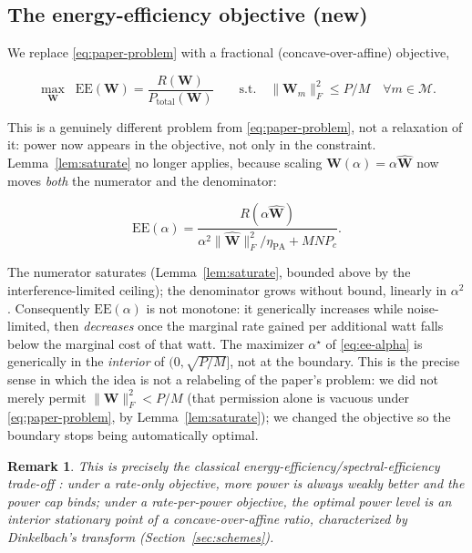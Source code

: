 \documentclass[11pt]{article}
\newtheorem{remark}{Remark}
\begin{document}
\subsection{The energy-efficiency objective (new)}

We replace \eqref{eq:paper-problem} with a fractional (concave-over-affine)
objective,

\begin{equation}
  \max_{\mathbf{W}} \;\; \mathrm{EE}(\mathbf{W}) = \frac{R(\mathbf{W})}{P_{\text{total}}(\mathbf{W})}
  \qquad \text{s.t.} \quad \|\mathbf{W}_m\|_F^2 \le P/M \quad \forall m\in\mathcal{M}.
  \label{eq:ee-problem}
\end{equation}

This is a genuinely different problem from \eqref{eq:paper-problem}, not a
relaxation of it: power now appears in the objective, not only in the
constraint. Lemma~\ref{lem:saturate} no longer applies, because scaling
$\mathbf{W}(\alpha)=\alpha\hat{\mathbf{W}}$ now moves \emph{both} the
numerator and the denominator:

\begin{equation}
  \mathrm{EE}(\alpha) = \frac{R(\alpha\hat{\mathbf{W}})}
  {\alpha^2\|\hat{\mathbf{W}}\|_F^2/\eta_{\text{PA}} + MNP_c}.
  \label{eq:ee-alpha}
\end{equation}

The numerator saturates (Lemma~\ref{lem:saturate}, bounded above by the
interference-limited ceiling); the denominator grows without bound, linearly
in $\alpha^2$. Consequently $\mathrm{EE}(\alpha)$ is not monotone: it
generically increases while noise-limited, then \emph{decreases} once the
marginal rate gained per additional watt falls below the marginal cost of
that watt. The maximizer $\alpha^\star$ of \eqref{eq:ee-alpha} is generically
in the \emph{interior} of $(0,\sqrt{P/M}]$, not at the boundary. This is the
precise sense in which the idea is not a relabeling of the paper's problem:
we did not merely permit $\|\mathbf{W}\|_F^2 < P/M$ (that permission alone is
vacuous under \eqref{eq:paper-problem}, by Lemma~\ref{lem:saturate}); we
changed the objective so the boundary stops being automatically optimal.

\begin{remark}
This is precisely the classical energy-efficiency/spectral-efficiency
trade-off \cite{Chen2011}: under a rate-only objective, more power is always
weakly better and the power cap binds; under a rate-per-power objective, the
optimal power level is an interior stationary point of a concave-over-affine
ratio, characterized by Dinkelbach's transform (Section~\ref{sec:schemes}).
\end{remark}
\end{document}
